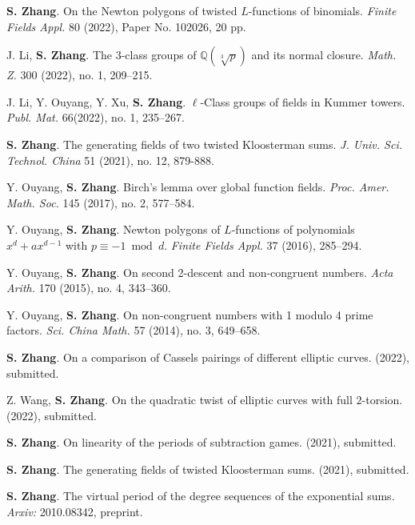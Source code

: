 \documentclass[11pt]{article}
\begin{document}
\begin{cvlist}
\item \textbf{S. Zhang}.
On the Newton polygons of twisted $L$-functions of binomials.
{\em Finite Fields Appl.} 80 (2022), Paper No. 102026, 20 pp.

\item J. Li, \textbf{S. Zhang}.
The $3$-class groups of $\mathbb{Q}(\sqrt[3]{p})$ and its normal closure.
{\em Math. Z.} 300 (2022), no. 1, 209--215.

\item J. Li, Y. Ouyang, Y. Xu, \textbf{S. Zhang}.
$\ell$-Class groups of fields in Kummer towers.
{\em Publ. Mat.} 66(2022), no. 1, 235--267.

\item \textbf{S. Zhang}.
The generating fields of two twisted Kloosterman sums.
{\em J. Univ. Sci. Technol. China} 51 (2021), no. 12, 879-888.

\item Y. Ouyang, \textbf{S. Zhang}.
Birch's lemma over global function fields.
{\em Proc. Amer. Math. Soc.} 145 (2017), no. 2, 577--584.

\item Y. Ouyang, \textbf{S. Zhang}.
Newton polygons of $L$-functions of polynomials $x^d+ax^{d-1}$ with $p\equiv -1 \bmod d$.
{\em Finite Fields Appl.} 37 (2016), 285--294.

\item Y. Ouyang, \textbf{S. Zhang}.
On second 2-descent and non-congruent numbers.
{\em Acta Arith.} 170 (2015), no. 4, 343--360.

\item Y. Ouyang, \textbf{S. Zhang}.
On non-congruent numbers with 1 modulo 4 prime factors.
{\em Sci. China Math.} 57 (2014), no. 3, 649--658.
\end{cvlist}


\begin{cvlist}
\item \textbf{S. Zhang}.
On a comparison of Cassels pairings of different elliptic curves.
(2022), submitted.

\item Z. Wang, \textbf{S. Zhang}.
On the quadratic twist of elliptic curves with full $2$-torsion.
(2022), submitted.

\item \textbf{S. Zhang}.
On linearity of the periods of subtraction games.
(2021), submitted.

\item \textbf{S. Zhang}.
The generating fields of twisted Kloosterman sums.
(2021), submitted.

\item \textbf{S. Zhang}.
The virtual period of the degree sequences of the exponential sums.
{\em Arxiv:} 2010.08342, preprint.
\end{cvlist}
\end{document}
